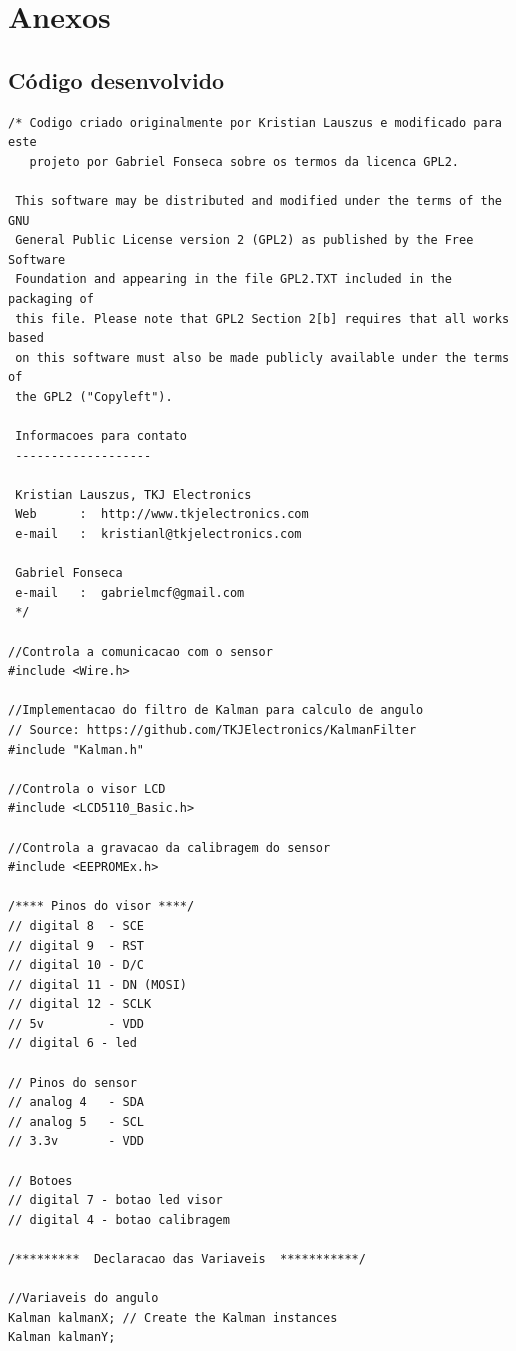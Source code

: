 \documentclass[a4paper,12pt]{article}
\begin{document}
\section{Anexos}
\label{anexos}

\subsection{Código desenvolvido}
{\singlespace\begin{lstlisting}
/* Codigo criado originalmente por Kristian Lauszus e modificado para este
   projeto por Gabriel Fonseca sobre os termos da licenca GPL2.
 
 This software may be distributed and modified under the terms of the GNU
 General Public License version 2 (GPL2) as published by the Free Software
 Foundation and appearing in the file GPL2.TXT included in the packaging of
 this file. Please note that GPL2 Section 2[b] requires that all works based
 on this software must also be made publicly available under the terms of
 the GPL2 ("Copyleft").
 
 Informacoes para contato
 -------------------
 
 Kristian Lauszus, TKJ Electronics
 Web      :  http://www.tkjelectronics.com
 e-mail   :  kristianl@tkjelectronics.com
 
 Gabriel Fonseca
 e-mail   :  gabrielmcf@gmail.com
 */

//Controla a comunicacao com o sensor
#include <Wire.h>

//Implementacao do filtro de Kalman para calculo de angulo
// Source: https://github.com/TKJElectronics/KalmanFilter
#include "Kalman.h" 

//Controla o visor LCD
#include <LCD5110_Basic.h>

//Controla a gravacao da calibragem do sensor
#include <EEPROMEx.h>

/**** Pinos do visor ****/
// digital 8  - SCE
// digital 9  - RST
// digital 10 - D/C
// digital 11 - DN (MOSI)
// digital 12 - SCLK
// 5v         - VDD
// digital 6 - led

// Pinos do sensor
// analog 4   - SDA
// analog 5   - SCL
// 3.3v       - VDD

// Botoes
// digital 7 - botao led visor
// digital 4 - botao calibragem

/*********  Declaracao das Variaveis  ***********/

//Variaveis do angulo
Kalman kalmanX; // Create the Kalman instances
Kalman kalmanY;


\end{lstlisting}}
\end{document}
